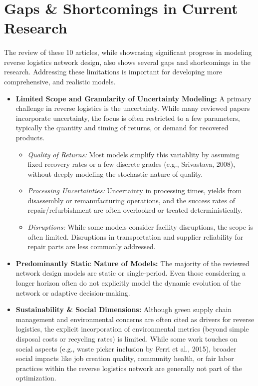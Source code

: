 \section{Gaps \& Shortcomings in Current Research}

\paragraph{} The review of these 10 articles, while showcasing significant progress in modeling reverse logistics network design, also shows several gaps and shortcomings in the research. Addressing these limitations is important for developing more comprehensive, and realistic models.

\begin{itemize}[label=,leftmargin=2mm]
    \item \textbf{Limited Scope and Granularity of Uncertainty Modeling:}
        A primary challenge in reverse logistics is the uncertainty. While many reviewed papers incorporate uncertainty, the focus is often restricted to a few parameters, typically the quantity and timing of returns, or demand for recovered products.
        \begin{itemize}
            \item \textit{Quality of Returns:} Most models simplify this variablity by assuming fixed recovery rates or a few discrete grades (e.g., Srivastava, 2008), without deeply modeling the stochastic nature of quality.
            \item \textit{Processing Uncertainties:} Uncertainty in processing times, yields from disassembly or remanufacturing operations, and the success rates of repair/refurbishment are often overlooked or treated deterministically.
            \item \textit{Disruptions:} While some models consider facility disruptions, the scope is often limited. Disruptions in transportation and supplier reliability for repair parts are less commonly addressed.
        \end{itemize}

    \item \textbf{Predominantly Static Nature of Models:}
        The majority of the reviewed network design models are static or single-period. Even those considering a longer horizon often do not explicitly model the dynamic evolution of the network or adaptive decision-making.

    \item \textbf{Sustainability \& Social Dimensions:}
        Although green supply chain management and environmental concerns are often cited as drivers for reverse logistics, the explicit incorporation of environmental metrics (beyond simple disposal costs or recycling rates) is limited. While some work touches on social aspects (e.g., waste picker inclusion by Ferri et al., 2015), broader social impacts like job creation quality, community health, or fair labor practices within the reverse logistics network are generally not part of the optimization.


\end{itemize}
